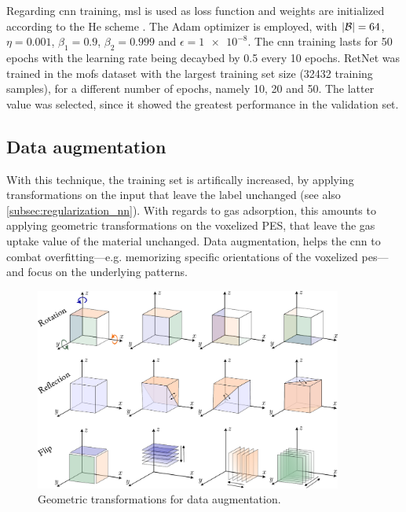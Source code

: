 Regarding \gls{cnn} training, \gls{msl} is used as loss
function and weights are initialized according to the He scheme
\parencite{He2015}. The Adam optimizer \parencite{Kingma2017} is employed, with
$\lvert\mathcal{B}\rvert = \num{64}$, $\eta = \num{0.001}$, $\beta_1 = \num{0.9}$,
$\beta_2 = \num{0.999}$ and $\epsilon = \num{1e-8}$. The \gls{cnn} training lasts for
\num{50} epochs with the learning rate being decaybed by \num{0.5} every
\num{10} epochs. RetNet was trained in the \glspl{mof} dataset with
the largest training set size (\num{32432} training samples), for a different
number of epochs, namely \num{10}, \num{20} and \num{50}. The latter value was
selected, since it showed the greatest performance in the validation
set.

\subsection{Data augmentation}
\label{subsec:data_augmentation}

With this technique, the training set is artifically
increased, by applying transformations on the
input that leave the label unchanged (see also \Section{}
\ref{subsec:regularization_nn}). With regards to gas adsorption, this amounts to
applying geometric transformations on the voxelized PES, that leave the gas
uptake value of the material unchanged. Data augmentation, helps the \gls{cnn}
to combat overfitting---e.g. memorizing specific orientations
of the voxelized \gls{pes}---and focus on the underlying patterns.

\begin{figure}
	\centering
	\includegraphics[width=0.9\textwidth]{fig/transformations.pdf}
	\caption{Geometric transformations for data
	augmentation.}
	\label{fig:transformations}
\end{figure}

